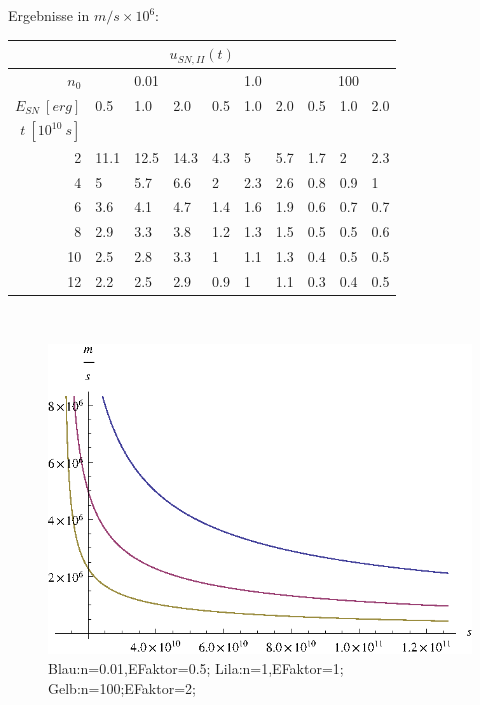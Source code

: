Ergebnisse in $m/s \times 10^{6}$:
\begin{center}
\begin{tabular}{|r|l|l|l|l|l|l|l|l|l|}
\multicolumn{10}{c}{\(u_{SN,II}(t)\)}\\
\hline
\(n_0\) & \multicolumn{3}{|c|}{0.01} & \multicolumn{3}{|c|}{1.0} & \multicolumn{3}{|c|}{100}\\
\hline
\(E_{SN}~[erg]\) & 0.5 & 1.0 & 2.0 & 0.5 & 1.0 & 2.0 & 0.5 & 1.0 & 2.0\\
\hline
\(t~[10^{10}~s]\) & & & & & & & & & \\
\cline{1-1}
2 & 11.1 & 12.5 & 14.3 &
4.3 & 5 & 5.7 &
1.7 & 2 & 2.3 \\

4 & 5 & 5.7 & 6.6 &
2 & 2.3 & 2.6 &
0.8 & 0.9 & 1 \\

6 & 3.6 & 4.1 & 4.7 &
1.4 & 1.6 & 1.9 &
0.6 & 0.7 & 0.7 \\

8 & 2.9 & 3.3 & 3.8 &
1.2 & 1.3 & 1.5 &
0.5 & 0.5 & 0.6 \\

10 & 2.5 & 2.8 & 3.3 &
1 & 1.1 & 1.3 &
0.4 & 0.5 & 0.5 \\

12 & 2.2 & 2.5 & 2.9 &
0.9 & 1 & 1.1 &
0.3 & 0.4 & 0.5 \\
\hline
\end{tabular}\\
\end{center}
\begin{figure}[ht]
\begin{center}
\includegraphics{aufgabe6u.eps}
\end{center}
\caption[Bildunterschrift]{Blau:n=0.01,EFaktor=0.5; Lila:n=1,EFaktor=1; Gelb:n=100;EFaktor=2;}
\end{figure}

